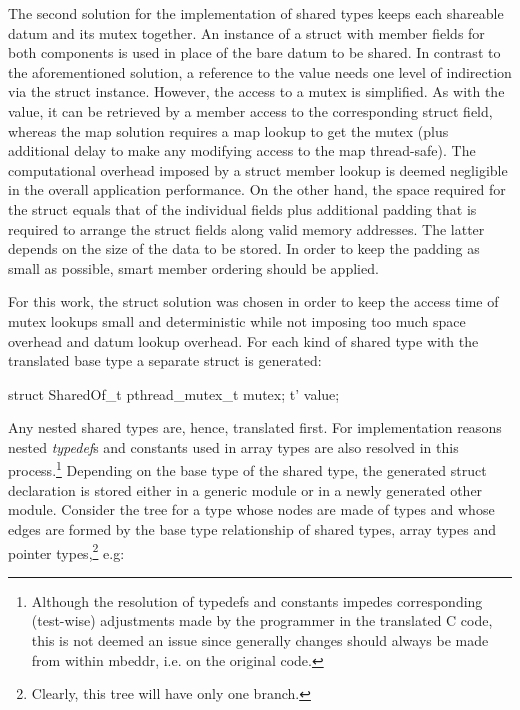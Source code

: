 The second solution for the implementation of shared types keeps each shareable datum and its mutex together. An instance of a struct with member fields for both components is used in place of the bare datum to be shared. In contrast to the aforementioned solution, a reference to the value  needs one level of indirection via the struct instance. However, the access to a mutex is simplified. As with the value, it can be retrieved by a member access to the corresponding struct field, whereas the map solution requires a map lookup to get the mutex (plus additional delay to make any modifying access to the map thread-safe). The computational overhead imposed by a struct member lookup is deemed negligible in the overall application performance. On the other hand, the space required for the struct equals that of the individual fields plus additional padding \cite[pp.~303 ff.]{LinuxSystemProgramming} that is required to arrange the struct fields along valid memory addresses. The latter depends on the size of the data to be stored. In order to keep the padding as small as possible, smart member ordering should be applied. 

For this work, the struct solution was chosen in order to keep the access time of mutex lookups small and deterministic while not imposing too much space overhead and datum lookup overhead. For each kind of shared type  with the translated base type  a separate struct is generated:
\begin{ccode}
struct SharedOf_t {
  pthread_mutex_t mutex;
  t' value;
}
\end{ccode}
Any nested shared types are, hence, translated first. For implementation reasons nested \textit{typedef}s and constants used in array types are also resolved in this process.\footnote{Although the resolution of typedefs and constants impedes corresponding (test-wise) adjustments made by the programmer in the translated C code, this is not deemed an issue since generally changes should always be made from within mbeddr, i.e. on the original code.} Depending on the base type of the shared type, the generated struct declaration is stored either in a generic module or in a newly generated other module. Consider the tree for a type  whose nodes are made of types and whose edges are formed by the base type relationship of shared types, array types and pointer types,\footnote{Clearly, this tree will have only one branch.} e.g: 


